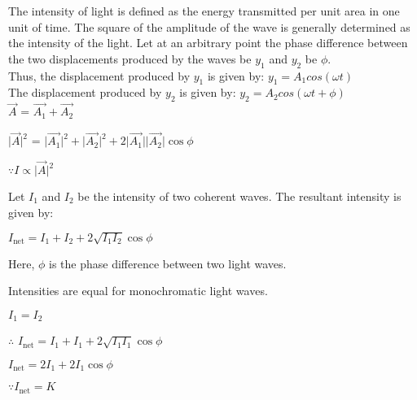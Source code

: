 \documentclass[journal,12pt,twocolumn]{IEEEtran}
\theoremstyle{remark}
\begin{document}
The intensity of light is defined as the energy transmitted per unit area in one unit of time. The square of the amplitude of the wave is generally determined as the intensity of the light. 
Let at an arbitrary point the phase difference between the two displacements produced by the waves be $y_1$ and $y_2$ be $\phi$.\\
Thus, the displacement produced by $y_1$ is given by:
\hspace*{1cm} $y_1 = A_1cos(\omega t )$ \\
The displacement produced by $y_2$ is given by:
\hspace*{1cm} $y_2 = A_2cos(\omega t + \phi)$ \\

\hspace*{1.8cm}$ \overrightarrow{A}$ = $\overrightarrow{A_1} + \overrightarrow{A_2}$ 

\vspace{0.2cm}

\hspace*{0.9cm}$\lvert \overrightarrow{A} \rvert^2$ = $\lvert\overrightarrow{A_1}\rvert^2 +\lvert \overrightarrow{A_2}\rvert^2 + 2\lvert\overrightarrow{A_1}\rvert\lvert\overrightarrow{A_2}\rvert \cos \phi$

\vspace{0.2cm}

\hspace*{1cm}$\because I \propto \lvert\overrightarrow{A}\rvert^2$

\vspace{0.2cm}

Let $I_1$ and $I_2$ be the intensity of two coherent waves. The resultant intensity is given by:

$I_{\text{net}} = I_1 + I_2 + 2\sqrt{I_1I_2}\cos{\phi}$

Here, $\phi$ is the phase difference between two light waves.

Intensities are equal for monochromatic light waves.

\hspace{1cm}$I_1 = I_2$

$\therefore$ $I_{\text{net}} = I_1 + I_1 + 2\sqrt{I_1I_1}\cos{\phi}$

\vspace{0.2cm}

       \hspace{0.2cm}      $I_{\text{net}} = 2I_1 + 2I_1\cos{\phi}$

$\because I_{\text{net}} = K$
\end{document}

